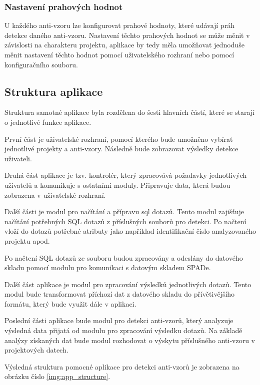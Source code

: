 \documentclass[czech,DP]{thesiskiv}
\begin{document}
\subsubsection{Nastavení prahových hodnot}
U každého anti-vzoru lze konfigurovat prahové hodnoty, které udávají práh detekce daného anti-vzoru. Nastavení těchto prahových hodnot se může měnit v závislosti na charakteru projektu, aplikace by tedy měla umožňovat jednoduše měnit nastavení těchto hodnot pomocí uživatelského rozhraní nebo pomocí konfiguračního souboru.  
\subsection{Struktura aplikace}
Struktura samotné aplikace byla rozdělena do šesti hlavních částí, které se starají o jednotlivé funkce aplikace.
\par
První část je uživatelské rozhraní, pomocí kterého bude umožněno vybírat jednotlivé projekty a anti-vzory. Následně bude zobrazovat výsledky detekce uživateli.
\par
Druhá část aplikace je tzv. kontrolér, který zpracovává požadavky jednotlivých uživatelů a komunikuje s ostatními moduly. Připravuje data, která budou zobrazena v uživatelské rozhraní.
\par
Další části je modul pro načítání a přípravu sql dotazů. Tento modul zajišťuje načítání potřebných SQL dotazů z příslušných souborů pro detekci. Po načtení vloží do dotazů potřebné atributy jako například identifikační číslo analyzovaného projektu apod.
\par
Po načtení SQL dotazů ze souboru budou zpracovány a odeslány do datového skladu pomocí modulu pro komunikaci s datovým skladem SPADe.
\par
Další část aplikace je modul pro zpracování výsledků jednotlivých dotazů. Tento modul bude transformovat příchozí dat z datového skladu do přívětivějšího formátu, který bude využit dále v aplikaci.
\par
Poslední části aplikace bude modul pro detekci anti-vzorů, který analyzuje výsledná data přijatá od modulu pro zpracování výsledku dotazů. Na základě analýzy získaných dat bude modul rozhodovat o výskytu příslušného anti-vzoru v projektových datech.
\par
Výsledná struktura pomocné aplikace pro detekci anti-vzorů je zobrazena na obrázku číslo \ref{img:app_structure}.
\end{document}
